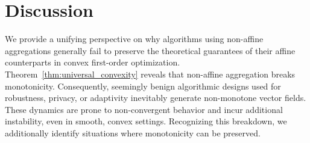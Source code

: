 \documentclass[twoside,11pt]{article}
\begin{document}

\section{Discussion}\label{sec:conclusion}

We provide a unifying perspective on why algorithms using non-affine aggregations generally fail to preserve the theoretical guarantees of their affine counterparts in convex first-order optimization.
Theorem~\ref{thm:universal_convexity} reveals that non-affine aggregation breaks monotonicity. 
Consequently, seemingly benign algorithmic designs used for robustness, privacy, or adaptivity inevitably generate non-monotone vector fields. 
These dynamics are prone to non-convergent behavior and incur additional instability, even in smooth, convex settings.
Recognizing this breakdown, we additionally identify situations where monotonicity can be preserved.
\end{document}
